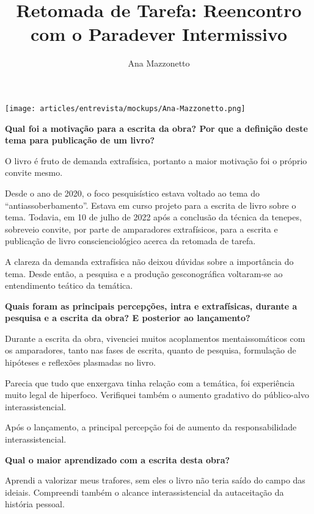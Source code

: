 \documentclass{gescons}
\author{Ana Mazzonetto}
\title{Retomada de Tarefa: Reencontro com o Paradever Intermissivo}
\begin{document}
    \makeentrevistatitle


    \begin{multicols}{2}


\begin{center}

    \texttt{[image: articles/entrevista/mockups/Ana-Mazzonetto.png]}
\end{center}

\textbf{Qual foi a motivação para a escrita da obra? Por que a definição deste tema para publicação de um livro?}

O livro é fruto de demanda extrafísica, portanto a maior motivação foi o próprio convite mesmo. 

Desde o ano de 2020, o foco pesquisístico estava voltado ao tema do “antiassoberbamento”. Estava em curso projeto para a escrita de livro sobre o tema. Todavia, em 10 de julho de 2022 após a conclusão da técnica da tenepes, sobreveio convite, por parte de amparadores extrafísicos, para a escrita e publicação de livro conscienciológico acerca da retomada de tarefa. 

A clareza da demanda extrafísica não deixou dúvidas sobre a importância do tema. Desde então, a pesquisa e a produção gesconográfica voltaram-se ao entendimento teático da temática.

\textbf{Quais foram as principais percepções, intra e extrafísicas, durante a pesquisa e a escrita da obra? E posterior ao lançamento?}

Durante a escrita da obra, vivenciei muitos acoplamentos mentaissomáticos com os amparadores, tanto nas fases de escrita, quanto de pesquisa, formulação de hipóteses e reflexões plasmadas no livro. 

Parecia que tudo que enxergava tinha relação com a temática, foi experiência muito legal de hiperfoco. Verifiquei também o aumento gradativo do público-alvo interassistencial.

Após o lançamento, a principal percepção foi de aumento da responsabilidade interassistencial. 

\textbf{Qual o maior aprendizado com a escrita desta obra?}

Aprendi a valorizar meus trafores, sem eles o livro não teria saído do campo das ideiais. Compreendi também o alcance interassistencial da autaceitação da história pessoal.

\\


\end{multicols}
\end{document}
